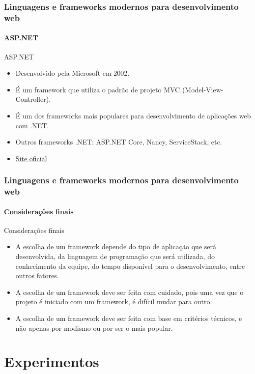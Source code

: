 \documentclass[
	9pt, %
	t, %
]{beamer}
\newcommand{\iconLink}[2]{\href{#1}{\faLink \hspace{0.2em} {#2}}}
\begin{document}
\begin{frame}
	\frametitle{Linguagens e frameworks modernos para desenvolvimento web}
	\framesubtitle{ASP.NET}

	\begin{block}{ASP.NET}
		\begin{itemize}
			\item Desenvolvido pela Microsoft em 2002. 
			\item É um framework que utiliza o padrão de projeto MVC (Model-View-Controller).
			\item É um dos frameworks mais populares para desenvolvimento de aplicações web com .NET.
			\item Outros frameworks .NET: ASP.NET Core, Nancy, ServiceStack, etc.
			\item \iconLink{https://dotnet.microsoft.com/apps/aspnet}{Site oficial}
		\end{itemize}
	\end{block}

\end{frame}

\begin{frame}
	\frametitle{Linguagens e frameworks modernos para desenvolvimento web}
	\framesubtitle{Considerações finais}

	\begin{block}{Considerações finais}
		\begin{itemize}
			\item A escolha de um framework depende do tipo de aplicação que será desenvolvida, da linguagem de programação que será utilizada, do conhecimento da equipe, do tempo disponível para o desenvolvimento, entre outros fatores.
			\item A escolha de um framework deve ser feita com cuidado, pois uma vez que o projeto é iniciado com um framework, é difícil mudar para outro.
			\item A escolha de um framework deve ser feita com base em critérios técnicos, e não apenas por modismo ou por ser o mais popular.
		\end{itemize}
	\end{block}

\end{frame}

\section{Experimentos}
\end{document}
